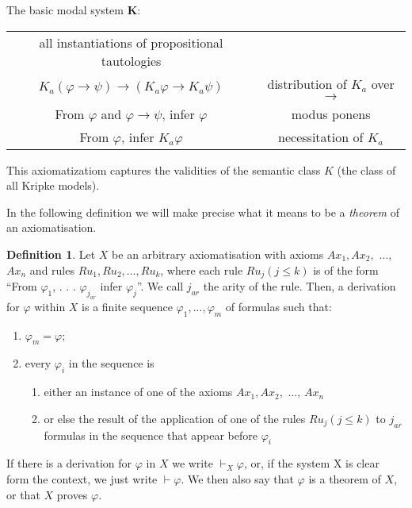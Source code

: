 \documentclass[12pt]{article}
\numberwithin{equation}{section}
\theoremstyle{definition}
\theoremstyle{definition}
\newtheorem{defn}[thm]{Definition}
\theoremstyle{remark}
\begin{document}
The basic modal system \textbf{K}:

\begin{center}
\begin{tabular}{ | c c |}
\hline
all instantiations of propositional tautologies &   \\
$K_a(\varphi \rightarrow \psi) \rightarrow (K_a\varphi \rightarrow K_a\psi)$ & distribution of $K_a$ over $\rightarrow$\\
From $\varphi$ and $\varphi \rightarrow \psi$, infer $\varphi$   &  modus ponens\\
From $\varphi$, infer $K_a \varphi$  &  necessitation of $K_a$\\

\hline
\end{tabular}
\end{center} 


This axiomatizatiom captures the validities of the semantic class $K$ (the class of all Kripke models).

In the following definition we will make precise what it means to be a \textit{theorem} of an axiomatisation.

\begin{defn}

Let $X$ be an arbitrary axiomatisation with axioms $Ax_1, Ax_2,$ $\dotsc$, $Ax_n$ and rules $Ru_1,Ru_2,\dotsc, Ru_k$, where each rule $Ru_j(j \leq k)$ is of the form “From $\varphi _1$, . . . $\varphi _{j_{ar}}$ infer $\varphi _j$”. We call $j_{ar}$ the arity of the rule. Then, a derivation for $\varphi$ within $X$ is a finite sequence $\varphi _1, . . . , \varphi _m$ of formulas such that:
\begin{enumerate}

\item $\varphi _m = \varphi$;
\item every $\varphi _i$ in the sequence is
\begin{enumerate}

\item  either an instance of one of the axioms $Ax_1, Ax_2,$ $\dotsc$, $Ax_n$
\item or else the result of the application of one of the rules $Ru_j(j \leq k)$ to $j_{ar}$ formulas in the sequence that appear before $\varphi _i$

\end{enumerate}

\end{enumerate}

If there is a derivation for $\varphi$ in $X$ we write $\vdash _X \varphi$, or, if the system X is clear form the context, we just write $\vdash \varphi$. We then also say that $\varphi$ is a theorem of $X$, or that $X$ proves $\varphi$.

\end{defn}
\end{document}
